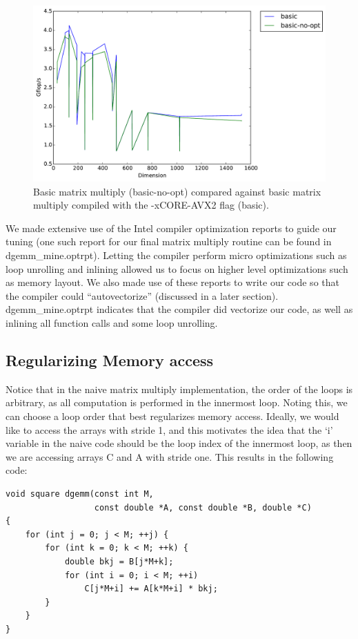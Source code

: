 \documentclass[fontsize=11pt]{scrartcl}
\numberwithin{equation}{section}        %
\numberwithin{figure}{section}          %
\numberwithin{table}{section}               %
\begin{document}
\begin{figure}[h]
    \centering
    \includegraphics[width=5.0in]{../final_timings/timing_basic_avx2.pdf}
    \caption{Basic matrix multiply (basic-no-opt) compared against basic matrix multiply compiled with the -xCORE-AVX2 flag (basic).}
    \label{fig:avx2}
\end{figure}

We made extensive use of the Intel compiler optimization reports to guide our
tuning (one such report for our final matrix multiply routine can be found in
dgemm\_mine.optrpt).  Letting the compiler perform micro optimizations such as 
loop unrolling and inlining allowed us to focus on higher level optimizations such
as memory layout.  We also made use of these reports to write our code so that
the compiler could ``autovectorize'' (discussed in a later section).
dgemm\_mine.optrpt indicates that the compiler did vectorize our code, as well as
inlining all function calls and some loop unrolling.

\subsection{Regularizing Memory access}
Notice that in the naive matrix multiply implementation, the order of the loops
is arbitrary, as all computation is performed in the innermost loop.
Noting this, we can choose a loop order that best regularizes memory access.
Ideally, we would like to access the arrays with stride 1, and this motivates the
idea that the `i' variable in the naive code should be the loop index of the
innermost loop, as then we are accessing arrays C and A with stride one.  
This results in the following code:

\begin{lstlisting}[frame = single, caption={Improved Loop Order Square Matrix Multiply}]
void square dgemm(const int M, 
                  const double *A, const double *B, double *C)
{
    for (int j = 0; j < M; ++j) {
        for (int k = 0; k < M; ++k) {
            double bkj = B[j*M+k];
            for (int i = 0; i < M; ++i)
                C[j*M+i] += A[k*M+i] * bkj;
        }
    }
}
\end{lstlisting}
\end{document}
